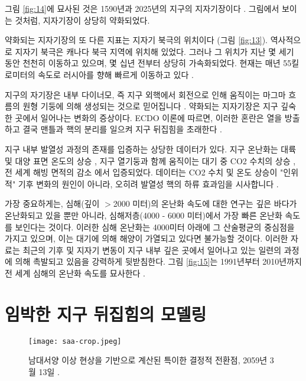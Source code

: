 \documentclass[10pt,twocolumn,letterpaper]{article}
\begin{document}
그림 \ref{fig:14}에 묘사된 것은 1590년과 2025년의 지구의 지자기장이다 \cite{125,126}. 그림에서 보이는 것처럼, 지자기장이 상당히 약화되었다.

약화되는 지자기장의 또 다른 지표는 지자기 북극의 위치이다 (그림 \ref{fig:13}). 역사적으로 지자기 북극은 캐나다 북극 지역에 위치해 있었다. 그러나 그 위치가 지난 몇 세기 동안 천천히 이동하고 있으며, 몇 십년 전부터 상당히 가속화되었다. 현재는 매년 55킬로미터의 속도로 러시아를 향해 빠르게 이동하고 있다 \cite{124}.



지구의 자기장은 내부 다이너모, 즉 지구 외핵에서 회전으로 인해 움직이는 마그마 흐름의 원형 기둥에 의해 생성되는 것으로 믿어집니다 \cite{123}. 약화되는 지자기장은 지구 깊숙한 곳에서 일어나는 변화의 증상이다. ECDO 이론에 따르면, 이러한 혼란은 열을 방출하고 결국 맨틀과 핵의 분리를 일으켜 지구 뒤집힘을 초래한다 \cite{1}.

지구 내부 발열성 과정의 존재를 입증하는 상당한 데이터가 있다. 지구 온난화는 대륙 및 대양 표면 온도의 상승 \cite{127,128}, 지구 열기둥과 함께  움직이는 대기 중 CO2 수치의 상승 \cite{129,130}, 전 세계 해빙 면적의 감소 \cite{131}에서 입증되었다. 데이터는 CO2 수치 및 온도 상승이 "인위적" 기후 변화의 원인이 아니라, 오히려 발열성 핵의 하류 효과임을 시사합니다 \cite{129}.

가장 중요하게는, 심해(깊이 $>$2000 미터)의 온난화 속도에 대한 연구는 깊은 바다가 온난화되고 있을 뿐만 아니라, 심해저층(4000 - 6000 미터)에서 가장 빠른 온난화 속도를 보인다는 것이다. 이러한 심해 온난화는 4000미터 아래에 그 산술평균의 중심점을 가지고 있으며\cite{132,129}, 이는 대기에 의해  해양이 가열되고 있다면 불가능할 것이다. 이러한 자료는 최근의  기후 및 지자기 변동이 지구 내부 깊은 곳에서 일어나고 있는 일련의 과정에 의해 촉발되고 있음을 강력하게 뒷받침한다. 그림 \ref{fig:15}는 1991년부터 2010년까지 전 세계 심해의 온난화 속도를 묘사한다 \cite{132}.

\section{임박한 지구 뒤집힘의 모델링}

\begin{figure}[b]
\begin{center}
   \texttt{[image: saa-crop.jpeg]}
\end{center}
   \caption{남대서양 이상 현상을 기반으로 계산된 특이한 결정적 전환점, 2059년 3월 13일 \cite{125,126}.}
\label{fig:16}
\label{fig:onecol}
\end{figure}
\end{document}
